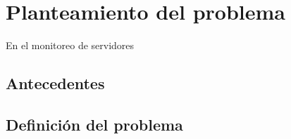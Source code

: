 \section{Planteamiento del problema}




En el monitoreo de servidores


\subsection{Antecedentes}\label{sec:Ant}


\subsection{Definición del problema}
